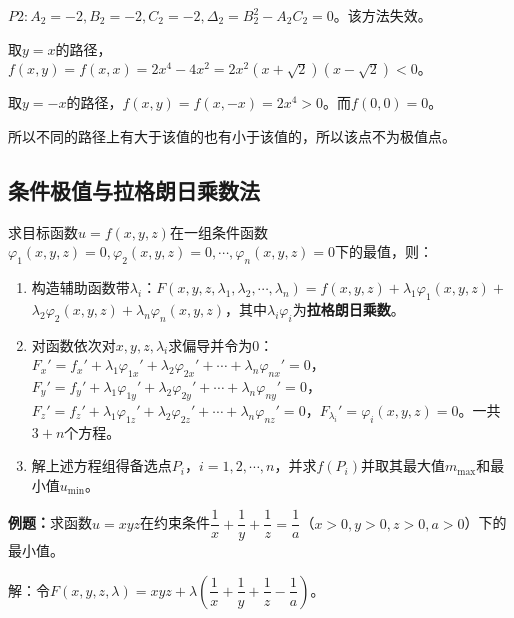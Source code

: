 \documentclass[UTF8, 12pt]{ctexart}
\begin{document}
$P2:A_2=-2,B_2=-2,C_2=-2,\Delta_2=B_2^2-A_2C_2=0$。该方法失效。

取$y=x$的路径，$f(x,y)=f(x,x)=2x^4-4x^2=2x^2(x+\sqrt{2})(x-\sqrt{2})<0$。

取$y=-x$的路径，$f(x,y)=f(x,-x)=2x^4>0$。而$f(0,0)=0$。

所以不同的路径上有大于该值的也有小于该值的，所以该点不为极值点。



\subsection{条件极值与拉格朗日乘数法}

求目标函数$u=f(x,y,z)$在一组条件函数$\varphi_1(x,y,z)=0,\varphi_2(x,y,z)=0,\cdots,\varphi_n(x,y,z)=0$下的最值，则：

\begin{enumerate}
    \item 构造辅助函数带$\lambda_i$：$F(x,y,z,\lambda_1,\lambda_2,\cdots,\lambda_n)=f(x,y,z)+\lambda_1\varphi_1(x,y,z)+$\\$\lambda_2\varphi_2(x,y,z)+\lambda_n\varphi_n(x,y,z)$，其中$\lambda_i\varphi_i$为\textbf{拉格朗日乘数}。
    \item 对函数依次对$x,y,z,\lambda_i$求偏导并令为0：$F_x'=f_x'+\lambda_1\varphi_{1x}'+\lambda_2\varphi_{2x}'+\cdots+\lambda_n\varphi_{nx}'=0$，$F_y'=f_y'+\lambda_1\varphi_{1y}'+\lambda_2\varphi_{2y}'+\cdots+\lambda_n\varphi_{ny}'=0$，$F_z'=f_z'+\lambda_1\varphi_{1z}'+\lambda_2\varphi_{2z}'+\cdots+\lambda_n\varphi_{nz}'=0$，$F_{\lambda_i}'=\varphi_i(x,y,z)=0$。一共$3+n$个方程。
    \item 解上述方程组得备选点$P_i$，$i=1,2,\cdots,n$，并求$f(P_i)$并取其最大值$m_{\max}$和最小值$u_{\min}$。
\end{enumerate}

\textbf{例题：}求函数$u=xyz$在约束条件$\dfrac{1}{x}+\dfrac{1}{y}+\dfrac{1}{z}=\dfrac{1}{a}$（$x>0,y>0,z>0,a>0$）下的最小值。

解：令$F(x,y,z,\lambda)=xyz+\lambda\left(\dfrac{1}{x}+\dfrac{1}{y}+\dfrac{1}{z}-\dfrac{1}{a}\right)$。
\end{document}
